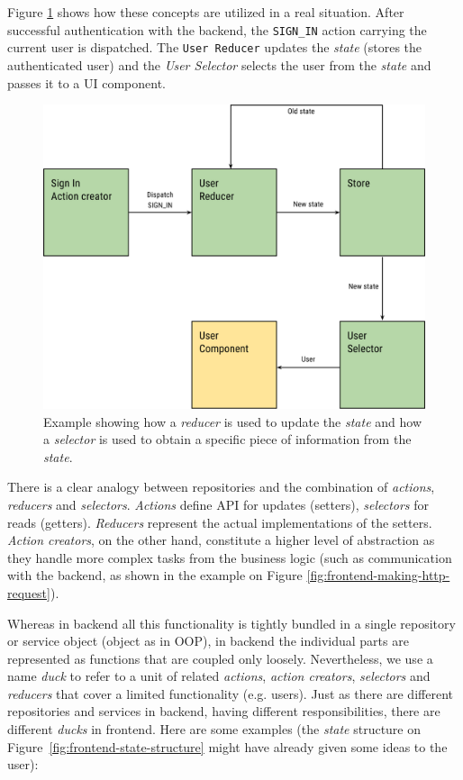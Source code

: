 Figure \ref{fig:frontend-reducer-and-selector} shows how these concepts are utilized in a real situation. After successful authentication with the backend, the \texttt{SIGN\_IN} action carrying the current user is dispatched. The \texttt{User Reducer} updates the \emph{state} (stores the authenticated user) and the \emph{User Selector} selects the user from the \emph{state} and passes it to a UI component.
\begin{figure}
	\centering
	\includegraphics[width=120mm]{img/04_frontend_reducer_and_selector.png}
	\caption{Example showing how a \emph{reducer} is used to update the \emph{state} and how a \emph{selector} is used to obtain a specific piece of information from the \emph{state}.} 
	\label{fig:frontend-reducer-and-selector}
\end{figure}

There is a clear analogy between repositories and the combination of \emph{actions}, \emph{reducers} and \emph{selectors}. \emph{Actions} define API for updates (setters), \emph{selectors} for reads (getters). \emph{Reducers} represent the actual implementations of the setters. \emph{Action creators}, on the other hand,  constitute a higher level of abstraction as they handle more complex tasks from the business logic (such as communication with the backend, as shown in the example on Figure \ref{fig:frontend-making-http-request}). 

Whereas in backend all this functionality is tightly bundled in a single repository or service object (object as in OOP), in backend the individual parts are represented as functions that are coupled only loosely. Nevertheless, we use a name \emph{duck} to refer to a unit of related \emph{actions}, \emph{action creators}, \emph{selectors} and \emph{reducers} that cover a limited functionality (e.g. users). Just as there are different repositories and services in backend, having different responsibilities, there are different \emph{ducks} in frontend. Here are some examples (the \emph{state} structure on Figure~\ref{fig:frontend-state-structure} might have already given some ideas to the user):

